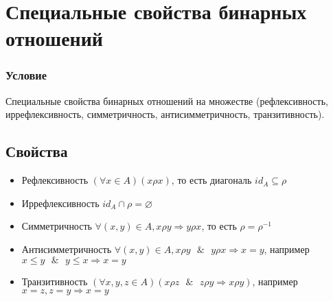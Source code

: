 \documentclass{report}
\newcommand{\band}{\mbox{ } \& \mbox{ }}
\begin{document}
\newpage
\section{Специальные свойства бинарных отношений}
\subsubsection{Условие}
Специальные свойства бинарных отношений на множестве (рефлексивность,
иррефлексивность, симметричность, антисимметричность, транзитивность).

\subsection{Свойства}
\begin{itemize}
	\item Рефлексивность\newline
	      $(\forall x \in A)(x\rho x)$, то есть диагональ $id_A \subseteq \rho$
	\item Иррефлексивность\newline
	      $id_A \cap \rho = \varnothing$
	\item Симметричность\newline
	      $\forall (x,y) \in A, x\rho y \Rightarrow y\rho x$, то есть $\rho = \rho^{-1}$
	\item  Антисимметричность\newline
	      $\forall (x,y) \in A, x\rho y \band y\rho x \Rightarrow x = y$, например $x \leq y \band y \leq x \Rightarrow x = y$
	\item Транзитивность\newline
	      $(\forall x,y,z \in A)(x\rho z \band z\rho y \Rightarrow x\rho y)$, например $x = z, z = y \Rightarrow x = y$
\end{itemize}
\newpage
\end{document}
